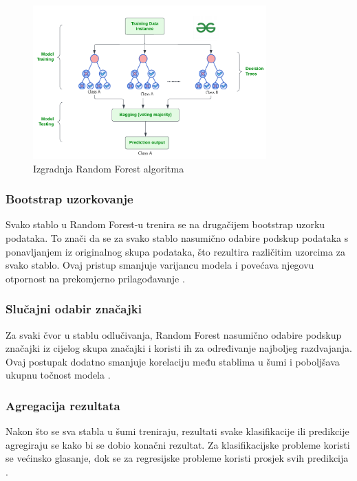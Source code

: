 \documentclass[zavrsnirad,upload]{fer}
\begin{document}
\begin{figure}[h]
	\centering
	\includegraphics[width=0.8\textwidth]{Figures/random_forests.png}
	\caption{Izgradnja Random Forest algoritma \cite{geeksforgeeks2021}}
	\label{fig:random_forest}
\end{figure}

\subsubsection{Bootstrap uzorkovanje}
Svako stablo u Random Forest-u trenira se na drugačijem bootstrap uzorku podataka. To znači da se za svako stablo nasumično odabire podskup podataka s ponavljanjem iz originalnog skupa podataka, što rezultira različitim uzorcima za svako stablo. Ovaj pristup smanjuje varijancu modela i povećava njegovu otpornost na prekomjerno prilagođavanje \cite{segal2004machine}.

\subsubsection{Slučajni odabir značajki}
Za svaki čvor u stablu odlučivanja, Random Forest nasumično odabire podskup značajki iz cijelog skupa značajki i koristi ih za određivanje najboljeg razdvajanja. Ovaj postupak dodatno smanjuje korelaciju među stablima u šumi i poboljšava ukupnu točnost modela \cite{segal2004machine}.

\subsubsection{Agregacija rezultata}
Nakon što se sva stabla u šumi treniraju, rezultati svake klasifikacije ili predikcije agregiraju se kako bi se dobio konačni rezultat. Za klasifikacijske probleme koristi se većinsko glasanje, dok se za regresijske probleme koristi prosjek svih predikcija \cite{sarica2017}.
\end{document}
